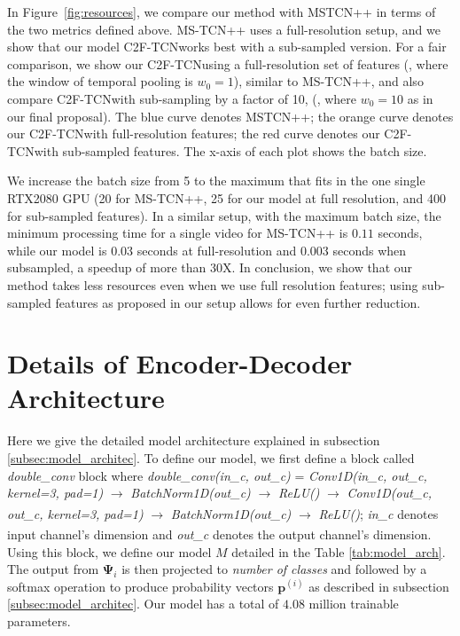 \documentclass[10pt,twocolumn,letterpaper]{article}
\newcommand{\bp}{\mathbf{p}}
\newcommand{\dec}{\ensuremath{\mathbf{\Psi}}}
\newcommand{\modelname}{C2F-TCN}
\begin{document}
In Figure~\ref{fig:resources}, we compare our method with MSTCN++ in terms of the two metrics defined above. MS-TCN++ uses a full-resolution setup, and we show that our model \modelname works best with a sub-sampled version. For a fair comparison, we show our \modelname using a full-resolution set of features (\ie, where the window of temporal pooling is $w_0=1$), similar to MS-TCN++, and also compare \modelname with sub-sampling by a factor of 10, (\ie, where $w_0=10$ as in our final proposal). The blue curve denotes MSTCN++; the orange curve denotes our \modelname with full-resolution features; the red curve denotes our \modelname with sub-sampled features. The x-axis of each plot shows the batch size. 

We increase the batch size from 5 to the maximum that fits in the one single RTX2080 GPU (20 for MS-TCN++, 25 for our model at full resolution, and 400 for sub-sampled features).  In a similar setup, with the maximum batch size, the minimum processing time for a single video for MS-TCN++ is $0.11$ seconds, while our model is $0.03$ seconds at full-resolution and $0.003$ seconds when subsampled, \ie a speedup of more than 30X. In conclusion, we show that our method takes less resources even when we use full resolution features; using sub-sampled features as proposed in our setup allows for even further reduction.  

\section{Details of Encoder-Decoder Architecture}

Here we give the detailed model architecture explained in subsection \ref{subsec:model_architec}. To define our model, we first define a block called \textit{double\_conv} block where \textit{double\_conv(in\_c, out\_c)} = \textit{Conv1D(in\_c, out\_c, kernel=3, pad=1)} $\xrightarrow[]{}$ \textit{BatchNorm1D(out\_c)} $\xrightarrow[]{}$ \textit{ReLU()} $\xrightarrow[]{}$ \textit{Conv1D(out\_c, out\_c, kernel=3, pad=1)} $\xrightarrow[]{}$ \textit{BatchNorm1D(out\_c)} $\xrightarrow[]{}$ \textit{ReLU()}; \textit{in\_c} denotes input channel's dimension and \textit{out\_c} denotes the output channel's dimension. Using this block, we define our model $M$ detailed in the Table \ref{tab:model_arch}. The output from $\dec_i$ is then projected to \textit{number of classes} and followed by a softmax operation to produce probability vectors $\bp^{(i)}$ as described in subsection \ref{subsec:model_architec}. Our model has a total of $4.08$ million trainable parameters.
\end{document}
